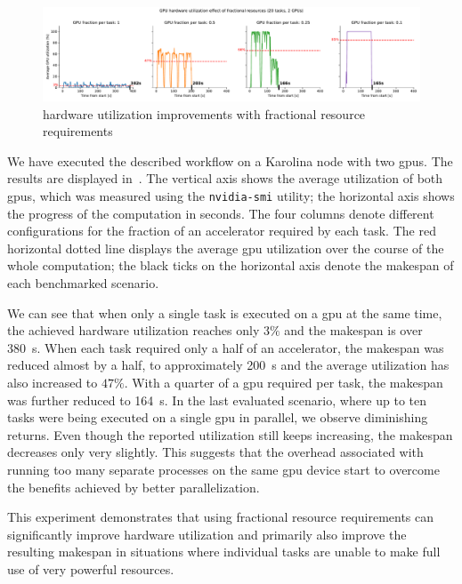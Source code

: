 \begin{figure}[h]
	\centering
	\includegraphics[width=\textwidth]{imgs/hq/charts/fractional-resources}
	\caption{ hardware utilization improvements with fractional resource requirements}
	\label{fig:hq-fractional-resources}
\end{figure}

We have executed the described workflow on a Karolina node with two \glspl{gpu}. The results are
displayed in~. The vertical axis shows the average
utilization of both \glspl{gpu}, which was measured using the \texttt{nvidia-smi} utility; the
horizontal axis shows the progress of the computation in seconds. The four columns denote different configurations for the fraction of an accelerator
required by each task. The red horizontal dotted line displays the average \gls{gpu} utilization
over the course of the whole computation; the black ticks on the horizontal axis denote the makespan
of each benchmarked scenario.

We can see that when only a single task is executed on a \gls{gpu} at the same time, the
achieved hardware utilization reaches only $3\%$ and the makespan is over \SI{380}{\second}.
When each task required only a half of an accelerator, the makespan was reduced almost
by a half, to approximately \SI{200}{\second} and the average utilization has also increased to
$47\%$. With a quarter of a \gls{gpu} required per task, the makespan was further reduced to
\SI{164}{\second}. In the last evaluated scenario, where up to ten tasks were being executed on a
single \gls{gpu} in parallel, we observe diminishing returns. Even though the reported
utilization still keeps increasing, the makespan decreases only very slightly. This suggests
that the overhead associated with running too many separate processes on the same \gls{gpu} device
start to overcome the benefits achieved by better parallelization.

This experiment demonstrates that using fractional resource requirements can significantly
improve hardware utilization and primarily also improve the resulting makespan in
situations where individual tasks are unable to make full use of very powerful resources.

